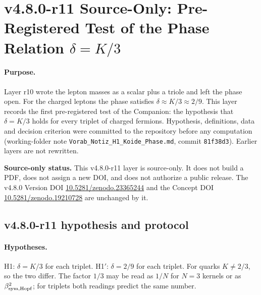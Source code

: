 
\clearpage
\section*{v4.8.0-r11 Source-Only: Pre-Registered Test of the Phase Relation \texorpdfstring{$\delta=K/3$}{delta = K/3}}
\label{sec:v480-r11-preregistered-h1}

\paragraph{Purpose.}
Layer r10 wrote the lepton masses as a scalar plus a triole and left the phase open.  For the charged
leptons the phase satisfies \(\delta\approx K/3\approx2/9\).  This layer records the first
pre-registered test of the Companion: the hypothesis that \(\delta=K/3\) holds for every triplet of
charged fermions.  Hypothesis, definitions, data and decision criterion were committed to the
repository before any computation (working-folder note \texttt{Vorab\_Notiz\_H1\_Koide\_Phase.md},
commit \texttt{81f38d3}).  Earlier layers are not rewritten.

\noindent\textbf{Source-only status.}
This v4.8.0-r11 layer is source-only.  It does not build a PDF, does not assign a new DOI,
and does not authorize a public release.  The v4.8.0 Version DOI
\href{https://doi.org/10.5281/zenodo.23365244}{10.5281/zenodo.23365244} and the Concept DOI
\href{https://doi.org/10.5281/zenodo.19210728}{10.5281/zenodo.19210728} are unchanged by it.

\subsection*{v4.8.0-r11 hypothesis and protocol}
\label{subsec:v480-r11-protocol}

\paragraph{Hypotheses.}
H1: \(\delta=K/3\) for each triplet.  H1\('\): \(\delta=2/9\) for each triplet.  For quarks
\(K\neq2/3\), so the two differ.  The factor \(1/3\) may be read as \(1/N\) for \(N=3\) kernels or as
\(\beta_{\rm sym,Hopf}^2\); for triplets both readings predict the same number.

